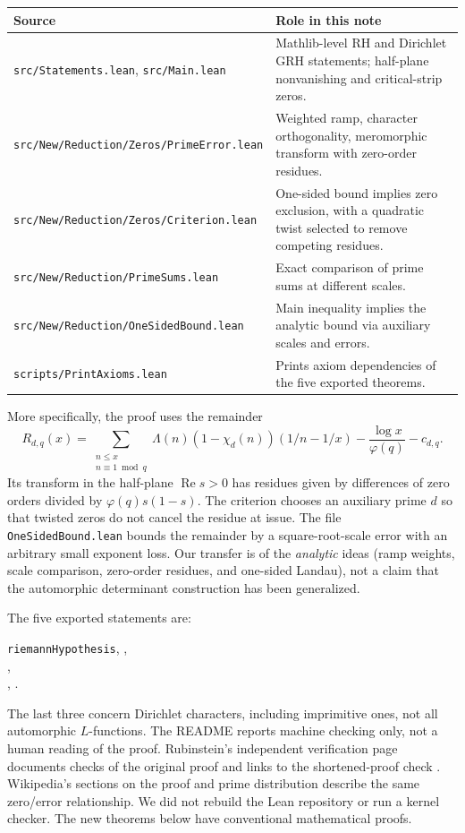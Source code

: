 \documentclass[11pt]{article}
\theoremstyle{remark}\newtheorem{remark}[theorem]{Remark}
\newcommand{\Rea}{\operatorname{Re}}
\begin{document}
\begin{center}\small
\begin{tabular}{p{.41\linewidth}p{.51\linewidth}}
\toprule
Source & Role in this note\\\midrule
\texttt{src/Statements.lean}, \texttt{src/Main.lean} & Mathlib-level RH and Dirichlet GRH statements; half-plane nonvanishing and critical-strip zeros.\\
\texttt{src/New/Reduction/Zeros/}\newline\texttt{PrimeError.lean} & Weighted ramp, character orthogonality, meromorphic transform with zero-order residues.\\
\texttt{src/New/Reduction/Zeros/}\newline\texttt{Criterion.lean} & One-sided bound implies zero exclusion, with a quadratic twist selected to remove competing residues.\\
\texttt{src/New/Reduction/PrimeSums.lean} & Exact comparison of prime sums at different scales.\\
\texttt{src/New/Reduction/OneSidedBound.lean} & Main inequality implies the analytic bound via auxiliary scales and errors.\\
\texttt{scripts/PrintAxioms.lean} & Prints axiom dependencies of the five exported theorems.\\\bottomrule
\end{tabular}
\end{center}

More specifically, the proof uses the remainder
\[
 R_{d,q}(x)=\sum_{\substack{n\le x\\n\equiv1\bmod q}}\Lambda(n)
 (1-\chi_d(n))(1/n-1/x)-\frac{\log x}{\varphi(q)}-c_{d,q}.
\]
Its transform in the half-plane $\Rea s>0$ has residues given by differences of zero orders divided by $\varphi(q)s(1-s)$. The criterion chooses an auxiliary prime $d$ so that twisted zeros do not cancel the residue at issue. The file \texttt{OneSidedBound.lean} bounds the remainder by a square-root-scale error with an arbitrary small exponent loss. Our transfer is of the \emph{analytic} ideas (ramp weights, scale comparison, zero-order residues, and one-sided Landau), not a claim that the automorphic determinant construction has been generalized.

The five exported statements are:\par\smallskip
{\small\noindent\texttt{riemannHypothesis}, ,\\
,\\
, .\par\smallskip}
\noindent The last three concern Dirichlet characters, including imprimitive ones, not all automorphic $L$-functions. The README reports machine checking only, not a human reading of the proof. Rubinstein's independent verification page documents checks of the original proof and links to the shortened-proof check \cite{rubinstein}. Wikipedia's sections on the proof and prime distribution \cite{wiki} describe the same zero/error relationship. We did not rebuild the Lean repository or run a kernel checker. The new theorems below have conventional mathematical proofs.
\end{document}
